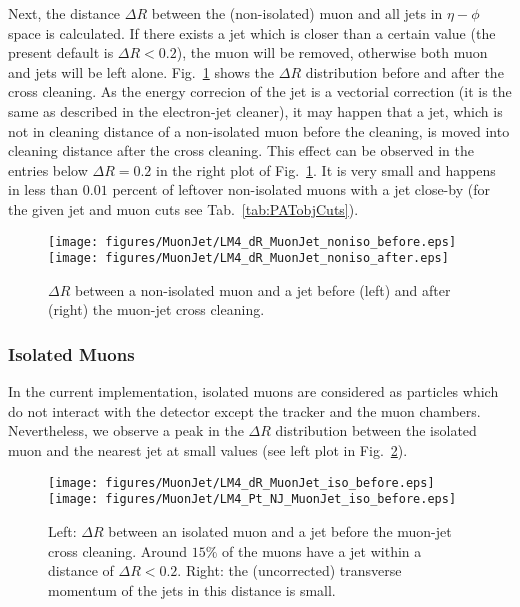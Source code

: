 \documentclass{cmspaper}
\begin{document}
Next, the distance \(\Delta R\) between the (non-isolated) muon and all jets in
\(\eta - \phi\) space is calculated. If there exists a jet which is closer than
a certain value (the present default is \(\Delta R < 0.2\)), the muon will be
removed, otherwise both muon and jets will be left alone.
Fig.~\ref{fig:dR_MuonJet_noniso} shows the $\Delta R$ distribution before and
after the cross cleaning. As the energy correcion of the jet is a vectorial
correction (it is the same as described in the electron-jet cleaner), it may
happen that a jet, which is not in cleaning distance of a non-isolated muon
before the cleaning, is moved into cleaning distance after the cross cleaning.
This effect can be observed in the entries below $\Delta R=0.2$ in the right plot of Fig.~\ref{fig:dR_MuonJet_noniso}. It is very small and happens in less than \(0.01\) percent of leftover
non-isolated muons with a jet close-by (for the given jet and muon
cuts see Tab.~\ref{tab:PATobjCuts}).

\begin{figure}[hb]
\begin{center}
    \texttt{[image: figures/MuonJet/LM4\_dR\_MuonJet\_noniso\_before.eps]}
    \texttt{[image: figures/MuonJet/LM4\_dR\_MuonJet\_noniso\_after.eps]}
    \caption{\(\Delta R\) between a non-isolated muon and a jet before (left) and
    after (right) the muon-jet cross cleaning.}
\label{fig:dR_MuonJet_noniso}
\end{center}
\end{figure}

\subsubsection{Isolated Muons}
In the current implementation,
isolated muons are considered as particles which do not interact with the
detector except the tracker and the muon chambers.  Nevertheless, we observe a
peak in the \(\Delta R\) distribution between the isolated muon and the nearest
jet at small values (see left plot in Fig.~\ref{fig:dR_MuonJet_iso}).

\begin{figure}[hb]
\begin{center}
    \texttt{[image: figures/MuonJet/LM4\_dR\_MuonJet\_iso\_before.eps]}
    \texttt{[image: figures/MuonJet/LM4\_Pt\_NJ\_MuonJet\_iso\_before.eps]}
    \caption{Left: \(\Delta R\) between an isolated muon and a jet before the
    muon-jet cross cleaning. Around \(15\%\) of the muons have a jet within a
    distance of \(\Delta R < 0.2\). Right: the (uncorrected) transverse momentum of the jets in this distance is small.}
\label{fig:dR_MuonJet_iso}
\end{center}
\end{figure}
\end{document}
